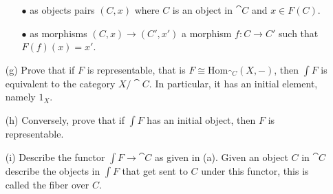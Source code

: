 \begin{problem}
\begin{itemize}
\begin{itemize}
\item[$\bullet$] as objects pairs $(C,x)$ where $C$ is an object in $\cat{C}$ and $x\in F(C)$.
\item[$\bullet$] as morphisms $(C,x) \to (C',x')$ a morphism $f: C \to C'$ such that $F(f)(x) = x'$.
\end{itemize}
\item[(g)] Prove that if $F$ is representable, that is $F \cong \mathrm{Hom}_{\cat{C}}(X,-)$, then $\int F$ is equivalent to the category $X/\cat{C}$. In particular, it has an initial element, namely $1_X$.
\item[(h)] Conversely, prove that if $\int F$ has an initial object, then $F$ is representable.
\item[(i)] Describe the functor $\int F \to \cat{C}$ as given in (a). Given an object $C$ in $\cat{C}$ describe the objects in $\int F$ that get sent to $C$ under this functor, this is called the fiber over $C$.
\end{itemize}
\end{problem}